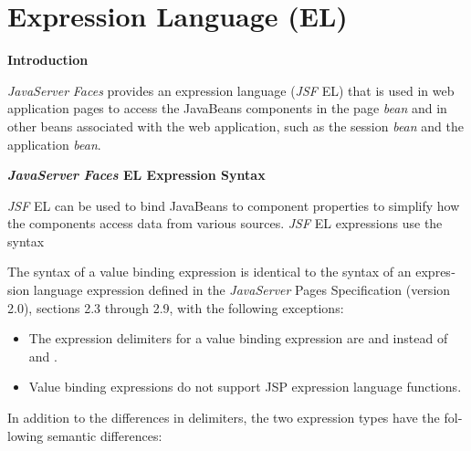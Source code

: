 \section{Expression Language (EL)}

{\bfseries
\foreignlanguage{spanish}{Intro}\foreignlanguage{english}{duction}}

\foreignlanguage{english}{\textit{JavaServer}}\foreignlanguage{english}{
}\foreignlanguage{english}{\textit{Faces}}\foreignlanguage{english}{
provides an expression language
(}\foreignlanguage{english}{\textit{JSF}}\foreignlanguage{english}{ EL)
that is used in web application pages to access the JavaBeans
components in the page
}\foreignlanguage{english}{\textit{bean}}\foreignlanguage{english}{ and
in other beans associated with the web application, such as the session
}\foreignlanguage{english}{\textit{bean}}\foreignlanguage{english}{ and
the application
}\foreignlanguage{english}{\textit{bean}}\foreignlanguage{english}{. }

{\bfseries
\foreignlanguage{english}{\textit{JavaServer}}\foreignlanguage{english}{
}\foreignlanguage{english}{\textit{Faces}}\foreignlanguage{english}{ EL
Expression Syntax}}

\foreignlanguage{english}{\textit{JSF}}\foreignlanguage{english}{ EL can
be used to bind JavaBeans to component properties to simplify how the
components access data from various sources.
}\foreignlanguage{english}{\textit{JSF}}\foreignlanguage{english}{ EL
expressions use the syntax
}\foreignlanguage{english}{
}

\foreignlanguage{english}{The syntax of a value binding expression is
identical to the syntax of an expression language expression defined in
the
}\foreignlanguage{english}{\textit{JavaServer}}\foreignlanguage{english}{
Pages Specification (version 2.0), sections 2.3 through 2.9, with the
following exceptions:}

\liststyleWWNumxviii
\begin{itemize}
\item \foreignlanguage{english}{The expression delimiters for a value
binding expression are
}\foreignlanguage{english}{
and
}\foreignlanguage{english}{
instead\newline
of
}\foreignlanguage{english}{
and
}\foreignlanguage{english}{.
}
\item \foreignlanguage{english}{Value binding expressions do not support
JSP expression language functions. }
\end{itemize}
\foreignlanguage{english}{In addition to the differences in delimiters,
the two expression types have the following semantic differences:}

